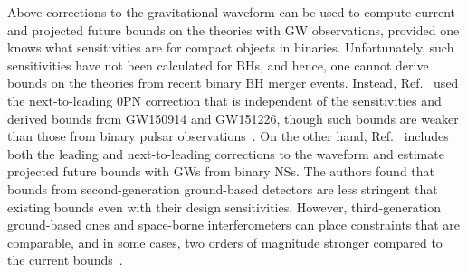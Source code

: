 \documentclass[prd,twocolumn,nofootinbib]{revtex4-1}
\newcommand{\KG}{{\mbox{\tiny kh}}}
\begin{document}
Above corrections to the gravitational waveform can be used to compute current and projected future bounds on the theories with GW observations, provided one knows what sensitivities are for compact objects in binaries. Unfortunately, such sensitivities have not been calculated for BHs, and hence, one cannot derive bounds on the theories from recent binary BH merger events. Instead, Ref.~\cite{Yunes:2016jcc} used the next-to-leading 0PN correction that is independent of the sensitivities and derived bounds from GW150914 and GW151226, though such bounds are weaker than those from binary pulsar observations~\cite{Yagi:2013ava,Yagi:2013qpa}. On the other hand, Ref.~\cite{Hansen:2014ewa} includes both the leading and next-to-leading corrections to the waveform and estimate projected future bounds with GWs from binary NSs. The authors found that bounds from second-generation ground-based detectors are less stringent that existing bounds even with their design sensitivities.
However, third-generation ground-based ones and space-borne interferometers can place constraints that are comparable, and in some cases, two orders of magnitude stronger compared to the current bounds~\cite{Chamberlain:2017fjl,Hansen:2014ewa}.
  
\end{document}

